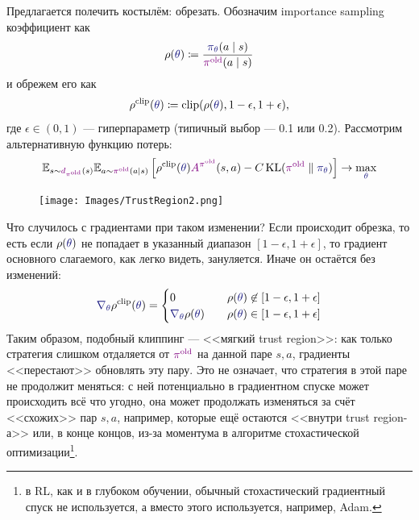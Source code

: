 Предлагается полечить костылём: обрезать. Обозначим importance sampling коэффициент как
$$\rho(\textcolor{ChadBlue}{\theta}) \coloneqq \frac{\textcolor{ChadBlue}{\pi_\theta}(a \mid s)}{\textcolor{ChadPurple}{\pi^{\old}}(a \mid s)}$$
и обрежем его как
$$\rho^{\clip}(\textcolor{ChadBlue}{\theta}) \coloneqq \clip(\rho(\textcolor{ChadBlue}{\theta}), 1 - \epsilon, 1 + \epsilon),$$
где $\epsilon \in (0, 1)$ --- гиперпараметр (типичный выбор --- 0.1 или 0.2). Рассмотрим альтернативную функцию потерь:
\begin{equation*}
\E_{s \sim \textcolor{ChadPurple}{d_{\pi^{\old}}}(s)} \E_{a \sim \textcolor{ChadPurple}{\pi^{\old}}(a \mid s)} \left[ \rho^{\clip}(\textcolor{ChadBlue}{\theta}) \textcolor{ChadPurple}{A^{\pi^{\old}}}(s, a) - C \KL(\textcolor{ChadPurple}{\pi^{\old}} \parallel \textcolor{ChadBlue}{\pi_\theta}) \right] \to \max_{\textcolor{ChadBlue}{\theta}}
\end{equation*}

\begin{figure}
\vspace{-0.5cm}
\centering
\texttt{[image: Images/TrustRegion2.png]}
\vspace{-0.5cm}
\end{figure}
Что случилось с градиентами при таком изменении? Если происходит обрезка, то есть если $\rho(\textcolor{ChadBlue}{\theta})$ не попадает в указанный диапазон $[1 - \epsilon, 1 + \epsilon]$, то градиент основного слагаемого, как легко видеть, зануляется. Иначе он остаётся без изменений:
$$\textcolor{ChadBlue}{\nabla_\theta} \rho^{\clip}(\textcolor{ChadBlue}{\theta}) = 
\begin{cases}
0 \quad &\rho(\textcolor{ChadBlue}{\theta}) \not\in [1 - \epsilon, 1 + \epsilon] \\
\textcolor{ChadBlue}{\nabla_\theta} \rho(\textcolor{ChadBlue}{\theta}) \quad &\rho(\textcolor{ChadBlue}{\theta}) \in [1 - \epsilon, 1 + \epsilon] \\
\end{cases}
$$
Таким образом, подобный клиппинг --- <<мягкий trust region>>: как только стратегия слишком отдаляется от $\textcolor{ChadPurple}{\pi^{\old}}$ на данной паре $s, a$, градиенты <<перестают>> обновлять эту пару. Это не означает, что стратегия в этой паре не продолжит меняться: с ней потенциально в градиентном спуске может происходить всё что угодно, она может продолжать изменяться за счёт <<схожих>> пар $s, a$, например, которые ещё остаются <<внутри trust region-а>> или, в конце концов, из-за моментума в алгоритме стохастической оптимизации\footnote{в RL, как и в глубоком обучении, обычный стохастический градиентный спуск не используется, а вместо этого используется, например, Adam.}.

